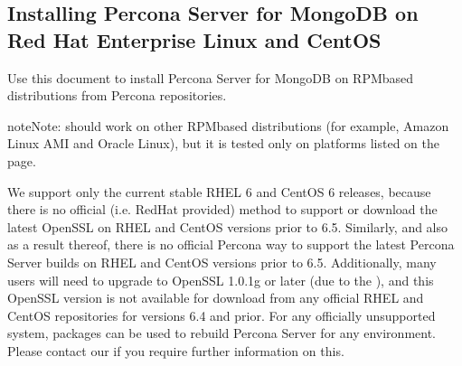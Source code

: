 \documentclass[letterpaper,10pt,english]{sphinxmanual}
\begin{document}
\subsection{Installing Percona Server for MongoDB on Red Hat Enterprise Linux and CentOS}
\label{\detokenize{install/yum:installing-percona-server-for-mongodb-on-red-hat-enterprise-linux-and-centos}}\label{\detokenize{install/yum:yum}}\label{\detokenize{install/yum::doc}}
\sphinxAtStartPar
Use this document to install Percona Server for MongoDB on RPM\sphinxhyphen{}based distributions from Percona repositories.

\begin{sphinxadmonition}{note}{Note:}
\sphinxAtStartPar
{} should work on other RPM\sphinxhyphen{}based distributions
(for example, Amazon Linux AMI and Oracle Linux),
but it is tested only on platforms listed on the  page. %
\begin{footnote}[1]\sphinxAtStartFootnote
We support only the current stable RHEL 6 and CentOS 6 releases,
because there is no official (i.e. RedHat provided) method to support
or download the latest OpenSSL on RHEL and CentOS versions prior to 6.5.
Similarly, and also as a result thereof,
there is no official Percona way to support the latest Percona Server builds
on RHEL and CentOS versions prior to 6.5.
Additionally, many users will need to upgrade to OpenSSL 1.0.1g or later
(due to the ),
and this OpenSSL version is not available for download
from any official RHEL and CentOS repositories for versions 6.4 and prior.
For any officially unsupported system,  packages can be used
to rebuild Percona Server for any environment.
Please contact our 
if you require further information on this.
%
\end{footnote}
\end{sphinxadmonition}
\end{document}

